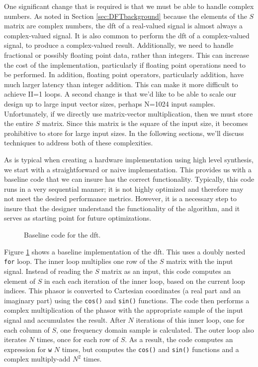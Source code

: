 One significant change that is required is that we must be able to handle complex numbers.  As noted in Section \ref{sec:DFTbackground} because the elements of the $S$ matrix are complex numbers, the \gls{dft} of a real-valued signal is almost always a complex-valued signal.   It is also common to perform the \gls{dft} of a complex-valued signal, to produce a complex-valued result.  Additionally, we need to handle fractional or possibly floating point data, rather than integers.  This can increase the cost of the implementation, particularly if floating point operations need to be performed.  In addition, floating point operators, particularly addition, have much larger latency than integer addition.  This can make it more difficult to achieve II=1 loops.  A second change is that we'd like to be able to scale our design up to large input vector sizes, perhaps N=1024 input samples.  Unfortunately, if we directly use matrix-vector multiplication, then we must store the entire $S$ matrix.  Since this matrix is the square of the input size, it becomes prohibitive to store for large input sizes.  In the following sections, we'll discuss techniques to address both of these complexities. 

As is typical when creating a hardware implementation using high level synthesis, we start with a straightforward or naive implementation. This provides us with a baseline code that we can insure has the correct functionality. Typically, this code runs in a very sequential manner; it is not highly optimized and therefore may not meet the desired performance metrics. However, it is a necessary step to insure that the designer understand the functionality of the algorithm, and it serves as starting point for future optimizations.

\begin{figure}
\begin{tiny}

\end{tiny}
\caption{Baseline code for the \gls{dft}.}
\label{fig:dft_code}
\end{figure}

Figure \ref{fig:dft_code} shows a baseline implementation of the \gls{dft}. This uses a doubly nested \lstinline|for| loop. The inner loop multiplies one row of the $S$ matrix with the input signal. Instead of reading the $S$ matrix as an input, this code computes an element of $S$ in each each iteration of the inner loop, based on the current loop indices.  This phasor is converted to Cartesian coordinates (a real part and an imaginary part) using the \lstinline|cos()| and \lstinline|sin()| functions. The code then performs a complex multiplication of the phasor with the appropriate sample of the input signal and accumulates the result. After $N$ iterations of this inner loop, one for each column of $S$, one frequency domain sample is calculated. The outer loop also iterates $N$ times, once for each row of $S$.  As a result, the code computes an expression for \lstinline|w| $N$ times, but computes the \lstinline|cos()| and \lstinline|sin()| functions and a complex multiply-add $N^2$ times.

